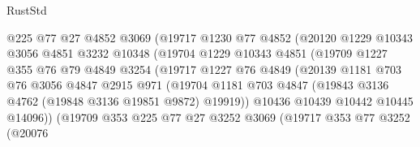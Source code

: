 \begin{lexlean}{RustStd}
\begin{coremodule}
                            @225
                            @77
                            @27
                            @4852
                            @3069
                            (@19717
                              @1230
                              @77
                              @4852
                              (@20120
                                @1229
                                @10343
                                @3056
                                @4851
                                @3232
                                @10348
                                (@19704
                                  @1229
                                  @10343
                                  @4851
                                  (@19709
                                    @1227
                                    @355
                                    @76
                                    @79
                                    @4849
                                    @3254
                                    (@19717
                                      @1227
                                      @76
                                      @4849
                                      (@20139
                                        @1181
                                        @703
                                        @76
                                        @3056
                                        @4847
                                        @2915
                                        @971
                                        (@19704
                                          @1181
                                          @703
                                          @4847
                                          (@19843 @3136 @4762 (@19848 @3136 @19851 @9872) @19919))
                                        @10436
                                        @10439
                                        @10442
                                        @10445
                                        @14096))
                                    (@19709
                                      @353
                                      @225
                                      @77
                                      @27
                                      @3252
                                      @3069
                                      (@19717
                                        @353
                                        @77
                                        @3252
                                        (@20076

\end{coremodule}
\end{lexlean}
